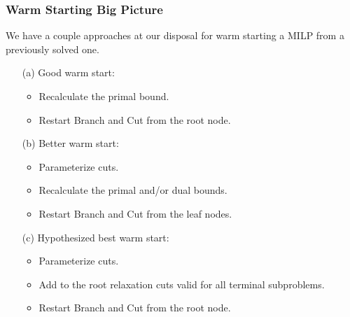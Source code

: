 \documentclass{beamer}
\begin{document}
	\begin{frame}[t]
		\frametitle{Warm Starting Big Picture}
		\small
		\begin{block}{}
			We have a couple approaches at our disposal for warm starting a MILP from a previously solved one.
		\end{block}
		\begin{itemize}
			\item [(a)] Good warm start:
			\begin{itemize}
				\item Recalculate the primal bound.
				\item Restart Branch and Cut from the root node.
			\end{itemize}
			\item [(b)] Better warm start:
			\begin{itemize}
				\item Parameterize cuts.
				\item Recalculate the primal and/or dual bounds.
				\item Restart Branch and Cut from the leaf nodes.
			\end{itemize}
			\item [(c)] Hypothesized best warm start:
			\begin{itemize}
				\item Parameterize cuts.
				\item Add to the root relaxation cuts valid for all terminal subproblems.
				\item Restart Branch and Cut from the root node.
			\end{itemize}
		\end{itemize}
		\normalsize
	\end{frame}
	
\end{document}
